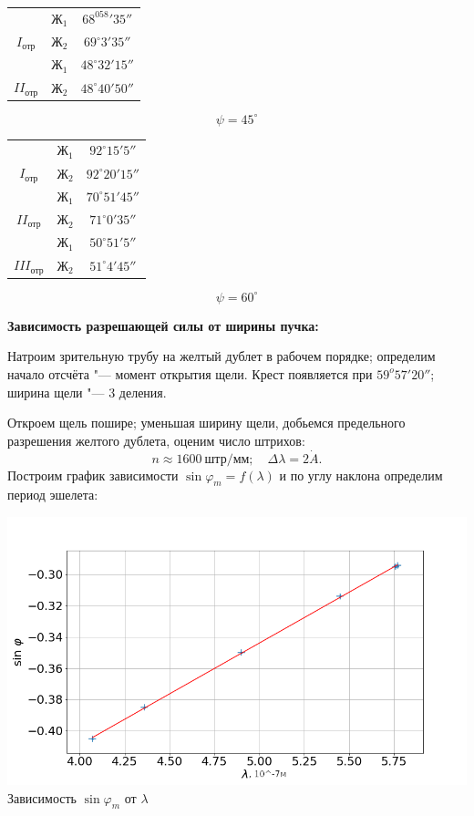 \begin{center}
\begin{tabular}{|c|c|c|} \hline
& $Ж_1$ & $68^058'35''$\\
\cline{2-3}
$I_{отр}$
& $Ж_2$ & $69^\circ3'35''$ \\\hline
& $Ж_1$ & $48^\circ32'15''$ \\
\cline{2-3}
$II_{отр}$
& $Ж_2$ & $48^\circ40'50''$ \\\hline
\end{tabular}
$$\psi = 45^\circ$$
\end{center}
  
\begin{center}
\begin{tabular}{|c|c|c|} \hline
& $Ж_1$ & $92^\circ15'5''$\\
\cline{2-3}
$I_{отр}$
& $Ж_2$ & $92^\circ20'15''$ \\\hline
& $Ж_1$ & $70^\circ51'45''$ \\
\cline{2-3}
$II_{отр}$
& $Ж_2$ & $71^\circ0'35''$ \\\hline
& $Ж_1$ & $50^\circ51'5''$\\
\cline{2-3}
$III_{отр}$
& $Ж_2$ & $51^\circ4'45''$ \\\hline
\end{tabular}
$$\psi = 60^\circ$$
\end{center}

\textbf{Зависимость разрешающей силы от ширины пучка:}

Натроим зрительную трубу на желтый дублет в рабочем порядке; определим начало отсчёта "--- момент открытия щели. Крест появляется при $59^o57'20''$; ширина щели "--- 3 деления.

Откроем щель пошире; уменьшая ширину щели, добьемся предельного разрешения желтого дублета, оценим число штрихов:
\[
     n \approx 1600\ \text{штр}/\text{мм}; \quad \Delta \lambda = 2 \dot A.
\]
Построим график зависимости $\sin \varphi_m = f(\lambda)$ и по углу наклона определим период эшелета:

\includegraphics[width = 1.0\linewidth]{g1.png}
{Зависимость $\sin \varphi_m$ от $\lambda$}

